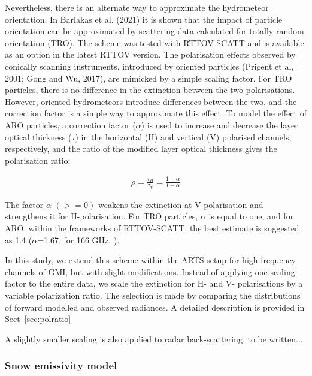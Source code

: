 \documentclass[amt, manuscript]{copernicus}
\newcommand{\todo}[1]{{\color{red} #1}}
\begin{document}
Nevertheless, there is an alternate way to approximate the hydrometeor orientation. In Barlakas et al. (2021) it is shown that the impact of particle orientation can be approximated by scattering data calculated for totally random orientation (TRO). The scheme was tested with RTTOV-SCATT and is available as an option in the latest RTTOV version. The polarisation effects observed by conically scanning instruments, introduced by oriented particles (Prigent et al, 2001; Gong and Wu, 2017), are mimicked by a simple scaling factor. For TRO particles, there is no difference in the extinction between the two polarisations. However, oriented hydrometeors introduce differences between the two, and the correction factor is a simple way to approximate this effect. To model the effect of ARO particles, a correction factor ($\alpha$) is used to increase and decrease the layer optical thickness ($\tau$) in the horizontal (H) and vertical (V) 
polarised channels, respectively, and the ratio of the modified layer optical thickness gives the polarisation ratio:

\begin{eqnarray}
\rho = \frac{\tau_H}{\tau_V} = \frac{1+\alpha}{1-\alpha}
\end{eqnarray}

The factor $\alpha$ $(>= 0)$  weakens the extinction at V-polarisation and strengthens it for H-polarisation. For TRO particles, $\alpha$ is equal to one, and for ARO, within the frameworks of RTTOV-SCATT, the best estimate is suggested as 1.4 ($\alpha$=1.67, for 166\,\,GHz, \citep{barlakas}).

In this study, we extend this scheme within the ARTS setup for high-frequency channels of GMI, but with slight modifications. Instead of applying one scaling factor to the entire data, we scale the extinction for H- and V- polarisations by a variable polarization ratio. The selection is made by comparing the distributions of forward modelled and observed radiances. A detailed description is provided in Sect~\ref{sec:polratio}

A slightly smaller scaling is also applied to radar back-scattering. \todo{to be written...} 


\subsubsection{Snow emissivity model}
\label{sec:snow_emissivity}
\end{document}
